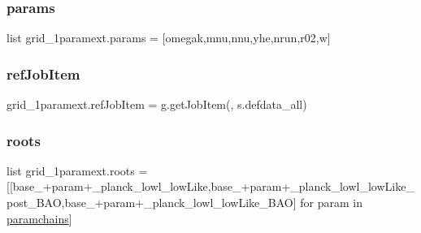 \mbox{\label{namespacegrid__1paramext_ab1b06985f22a35a6120d5f8804241717}} 
\subsubsection{\texorpdfstring{params}{params}}
{\footnotesize\ttfamily list grid\+\_\+1paramext.\+params = \mbox{[}\textquotesingle{}omegak\textquotesingle{},\textquotesingle{}mnu\textquotesingle{},\textquotesingle{}nnu\textquotesingle{},\textquotesingle{}yhe\textquotesingle{},\textquotesingle{}nrun\textquotesingle{},\textquotesingle{}r02\textquotesingle{},\textquotesingle{}w\textquotesingle{}\mbox{]}}

\mbox{\label{namespacegrid__1paramext_a154f305903ec5ce4075777eafa49bf59}} 
\subsubsection{\texorpdfstring{ref\+Job\+Item}{refJobItem}}
{\footnotesize\ttfamily grid\+\_\+1paramext.\+ref\+Job\+Item = g.\+get\+Job\+Item(\textquotesingle{}\textquotesingle{}, s.\+defdata\+\_\+all)}

\mbox{\label{namespacegrid__1paramext_aa7171bf862214d520bf9f13c6587414c}} 
\subsubsection{\texorpdfstring{roots}{roots}}
{\footnotesize\ttfamily list grid\+\_\+1paramext.\+roots = \mbox{[}\mbox{[}\textquotesingle{}base\+\_\+\textquotesingle{}+param+\textquotesingle{}\+\_\+planck\+\_\+lowl\+\_\+low\+Like\textquotesingle{},\textquotesingle{}base\+\_\+\textquotesingle{}+param+\textquotesingle{}\+\_\+planck\+\_\+lowl\+\_\+low\+Like\+\_\+post\+\_\+\+B\+AO\textquotesingle{},\textquotesingle{}base\+\_\+\textquotesingle{}+param+\textquotesingle{}\+\_\+planck\+\_\+lowl\+\_\+low\+Like\+\_\+\+B\+AO\textquotesingle{}\mbox{]} for param in \mbox{\hyperlink{namespacegrid__1paramext_ae777359a93a59db6706c4a5899c86727}{paramchains}}\mbox{]}}

